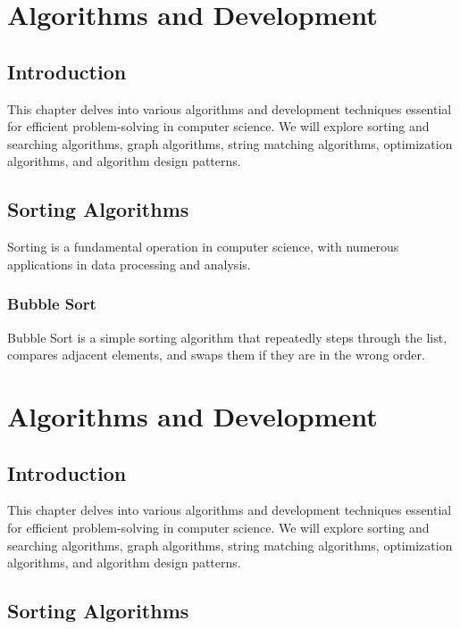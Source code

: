 
\chapter{Algorithms and Development}

\section{Introduction}

This chapter delves into various algorithms and development techniques
essential for efficient problem-solving in computer science. We will
explore sorting and searching algorithms, graph algorithms, string
matching algorithms, optimization algorithms, and algorithm design
patterns.

\section{Sorting Algorithms}

Sorting is a fundamental operation in computer science, with numerous
applications in data processing and analysis.

\subsection{Bubble Sort}

Bubble Sort is a simple sorting algorithm that repeatedly steps through
the list, compares adjacent elements, and swaps them if they are in the
wrong order.


\chapter{Algorithms and Development}

\section{Introduction}

This chapter delves into various algorithms and development techniques
essential for efficient problem-solving in computer science. We will
explore sorting and searching algorithms, graph algorithms, string
matching algorithms, optimization algorithms, and algorithm design
patterns.

\section{Sorting Algorithms}

